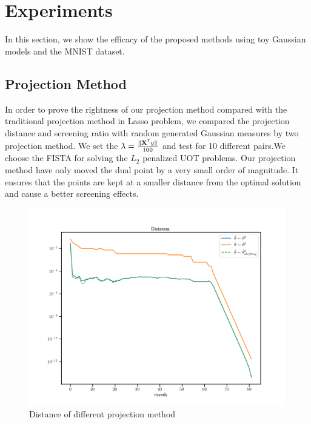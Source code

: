 \section{Experiments}
In this section, we show the efficacy of the proposed methods using toy Gaussian models and the MNIST dataset.
\subsection{Projection Method}
In order to prove the rightness of our projection method compared with the traditional projection method in Lasso problem, we compared the projection distance and screening ratio with random generated Gaussian measures by two projection method. We set the $\lambda = \frac{\|\mathbf{X}^{\mathsf T}y\|}{100}$ and test for 10 different pairs.We choose the FISTA for solving the $L_2$ penalized UOT problems. Our projection method have only moved the dual point by a very small order of magnitude. It ensures that the points are kept at a smaller distance from the optimal solution and cause a better screening effects.
	\begin{figure}[h]
	\begin{center}	
	\includegraphics[width = \linewidth]{pic/projdis}
	\caption{Distance of different projection method}
	\end{center}	
	\end{figure}
